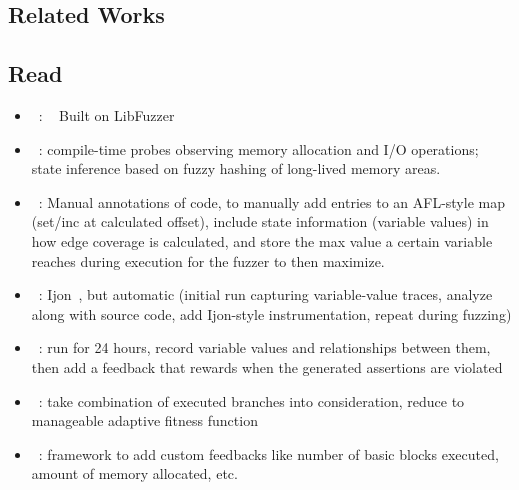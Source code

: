 \documentclass{article}
\let\savedCite=\cite
\renewcommand{\cite}{\unskip~\savedCite}
\begin{document}
\begin{multicols}{2}
  \section{Related Works}
  \subsection{Read}
  \begin{itemize}
    \item {}\cite{StatefulGreybox}: \cite{StatefulGreybox} Built on LibFuzzer
    \item {}\cite{StateAFL}: compile-time probes observing memory allocation and I/O operations; state inference based on fuzzy hashing of long-lived memory areas.
    \item {}\cite{Ijon}: Manual annotations of code, to manually add entries to an AFL-style map (set/inc at calculated offset), include state information (variable values) in how edge coverage is calculated, and store the max value a certain variable reaches during execution for the fuzzer to then maximize.
    \item {}\cite{SandPuppy}: Ijon\cite{Ijon}, but automatic (initial run capturing variable-value traces, analyze along with source code, add Ijon-style instrumentation, repeat during fuzzing)
    \item {}\cite{INVSCOV}: run for 24 hours, record variable values and relationships between them, then add a feedback that rewards when the generated assertions are violated
    \item {}\cite{Ankou}: take combination of executed branches into consideration, reduce to manageable adaptive fitness function
    \item {}\cite{FuzzFactory}: framework to add custom feedbacks like number of basic blocks executed, amount of memory allocated, etc.

\end{itemize}
\end{multicols}
\end{document}
